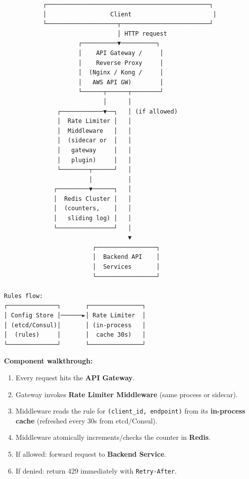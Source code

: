 \documentclass[11pt]{article}
\providecommand{\tightlist}{\setlength{\itemsep}{1pt}\setlength{\parskip}{0pt}}
\begin{document}
\setcodelang{}

\begin{verbatim}
           ┌──────────────────────────────────────────────┐
           │                  Client                       │
           └────────────────────┬─────────────────────────┘
                                │ HTTP request
                     ┌──────────▼──────────┐
                     │    API Gateway /     │
                     │    Reverse Proxy     │
                     │  (Nginx / Kong /     │
                     │   AWS API GW)        │
                     └──────┬──────┬────────┘
                            │      │
               ┌────────────▼──┐   │ (if allowed)
               │  Rate Limiter │   │
               │  Middleware   │   │
               │  (sidecar or  │   │
               │   gateway     │   │
               │   plugin)     │   │
               └────────┬──────┘   │
                        │          │
              ┌─────────▼──────┐   │
              │  Redis Cluster │   │
              │  (counters,    │   │
              │   sliding log) │   │
              └────────────────┘   │
                                   ▼
                         ┌─────────────────┐
                         │  Backend API    │
                         │  Services       │
                         └─────────────────┘

Rules flow:
┌──────────────┐       ┌───────────────┐
│ Config Store │──────►│ Rate Limiter  │
│ (etcd/Consul)│       │ (in-process   │
│  (rules)     │       │  cache 30s)   │
└──────────────┘       └───────────────┘
\end{verbatim}

\textbf{Component walkthrough:}

\begin{enumerate}
\def\labelenumi{\arabic{enumi}.}
\tightlist
\item
  Every request hits the \textbf{API Gateway}.
\item
  Gateway invokes \textbf{Rate Limiter Middleware} (same process or sidecar).
\item
  Middleware reads the rule for \texttt{(client\_id,\ endpoint)} from its \textbf{in-process cache} (refreshed every 30s from etcd/Consul).
\item
  Middleware atomically increments/checks the counter in \textbf{Redis}.
\item
  If allowed: forward request to \textbf{Backend Service}.
\item
  If denied: return 429 immediately with \texttt{Retry-After}.
\end{enumerate}
\end{document}
